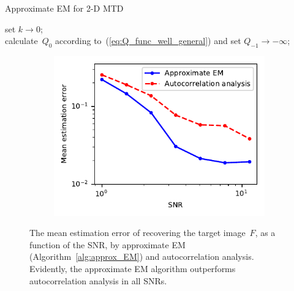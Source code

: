 \documentclass{article}
\begin{document}
\begin{algorithm}[!tb]
  \caption{Approximate EM for \mbox{2-D} MTD}\label{alg:approx_EM}
\BlankLine
set $k \rightarrow 0$;\\
calculate~$Q_{0}$ according to~(\ref{eq:Q_func_well_general}) and set $Q_{-1} \rightarrow -\infty$;\\
\end{algorithm}

\begin{figure}[!tb]
	\begin{subfigure}[ht]{\columnwidth}
		\centering
		\includegraphics[width=0.75\columnwidth]{figures/experiment_SNR_err.pdf}
	\end{subfigure}
	\caption{The mean estimation error of recovering the target image~$F$, as a function of the SNR, by approximate EM (Algorithm~\ref{alg:approx_EM}) and autocorrelation analysis. Evidently, the approximate EM algorithm outperforms autocorrelation analysis in all SNRs.}
\label{fig:noise_experiment}
\end{figure}
\end{document}
